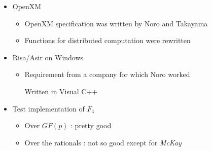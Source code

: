 \begin{slide}{}
\begin{itemize}
\item OpenXM

\begin{itemize}
\item OpenXM specification was written by Noro and Takayama

\item Functions for distributed computation were rewritten
\end{itemize}

\item Risa/Asir on Windows

\begin{itemize}
\item Requirement from a company for which Noro worked

Written in Visual C++
\end{itemize}

\item Test implementation of $F_4$

\begin{itemize}
\item Over $GF(p)$ : pretty good

\item Over the rationals : not so good except for {\it McKay}
\end{itemize}
\end{itemize}
\end{slide}

